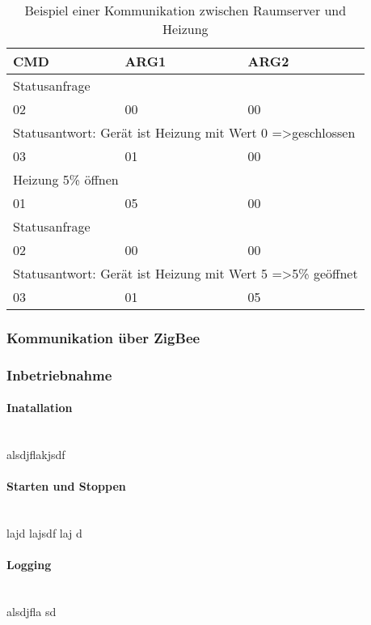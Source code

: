 \begin{table}[]
\centering
\begin{tabular}{|l|l|l|}
\hline
\textbf{CMD}                  & \textbf{ARG1}                 & \textbf{ARG2}                \\ \hline
\multicolumn{3}{|l|}{Statusanfrage}                                                          \\ \hline
02                            & 00                            & 00                           \\ \hline
\multicolumn{3}{|l|}{Statusantwort: Gerät ist Heizung mit Wert 0 =\textgreater geschlossen}  \\ \hline
03                            & 01                            & 00                           \\ \hline
\multicolumn{3}{|l|}{Heizung 5\% öffnen}                                                     \\ \hline
01                            & 05                            & 00                           \\ \hline
\multicolumn{3}{|l|}{Statusanfrage}                                                          \\ \hline
02                            & 00                            & 00                           \\ \hline
\multicolumn{3}{|l|}{Statusantwort: Gerät ist Heizung mit Wert 5 =\textgreater 5\% geöffnet} \\ \hline
03                            & 01                            & 05                           \\ \hline
\end{tabular}
\caption{Beispiel einer Kommunikation zwischen Raumserver und Heizung}
\label{PEx}
\end{table}

\subsubsection{Kommunikation über ZigBee}\label{ZigBee}

\subsubsection{Inbetriebnahme}

\paragraph{Inatallation}\mbox{}\\
alsdjflakjsdf

\paragraph{Starten und Stoppen}\mbox{}\\
lajd lajsdf laj d

\paragraph{Logging}\mbox{}\\
alsdjfla sd
